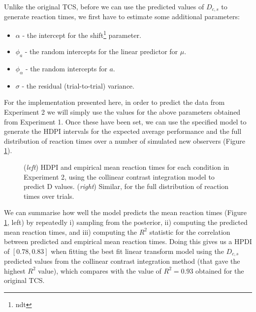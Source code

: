 \documentclass[smallextended, natbib]{svjour3}       %
\begin{document}
Unlike the original TCS, before we can use the predicted values of $D_{c,s}$ to generate reaction times, we first have to estimate some additional parameters: 

\begin{itemize}	
\item $\alpha$ - the intercept for the shift\footnote{ndt} parameter.
\item $\phi_a$ - the random intercepts for the linear predictor for $\mu$.
\item $\phi_\alpha$ - the random intercepts for $a$.
\item $\sigma$ - the residual (trial-to-trial) variance. 
\end{itemize}

For the implementation presented here, in order to predict the data from Experiment 2 we will simply use the values for the above parameters obtained from Experiment 1. Once these have been set, we can use the specified model to generate the HDPI intervals for the expected average performance and the full distribution of reaction times over a number of simulated new observers (Figure \ref{fig:buetti2019_rt}).

\begin{figure}
\centering
{}
\caption{(\textit{left}) HDPI and empirical mean reaction times for each condition in Experiment 2, using the collinear contrast integration model to predict D values. (\textit{right}) Similar, for the full distribution of reaction times over trials. }
\label{fig:buetti2019_rt}
\end{figure}

We can summarise how well the model predicts the mean reaction times (Figure \ref{fig:buetti2019_rt}, left) by repeatedly i) sampling from the posterior, ii) computing the predicted mean reaction times, and iii) computing the $R^2$ statistic for the correlation between predicted and empirical mean reaction times. Doing this gives us a HPDI of $[0.78, 0.83]$ when fitting the best fit linear transform model using the $D_{c,s}$ predicted values from the collinear contrast integration method (that gave the highest $R^2$ value), which compares with the value of $R^2 = 0.93$ obtained for the original TCS. 
\end{document}
